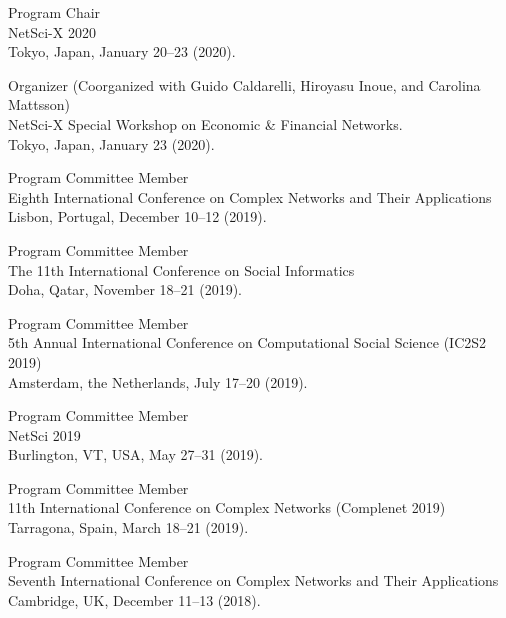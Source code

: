 \documentclass[11pt,letter]{article}
\renewenvironment{itemize}{
  \begin{list}{}{
    \setlength{\leftmargin}{1.5em}
    \setlength{\itemsep}{0.25em}
    \setlength{\parskip}{0pt}
    \setlength{\parsep}{0.25em}
  }
}{
  \end{list}
}
\begin{document}
\begin{itemize}
\item Program Chair\\
NetSci-X 2020\\
Tokyo, Japan, January 20--23 (2020).

\item Organizer (Coorganized with Guido Caldarelli, Hiroyasu Inoue, and Carolina Mattsson)\\
NetSci-X Special Workshop on Economic \& Financial Networks.\\
Tokyo, Japan, January 23 (2020).

\item Program Committee Member\\
Eighth International Conference on Complex Networks and Their Applications\\
Lisbon, Portugal, December 10--12 (2019).

\item Program Committee Member\\
The 11th International Conference on Social Informatics\\
Doha, Qatar, November 18--21 (2019).

\item Program Committee Member\\
5th Annual International Conference on Computational Social Science (IC2S2 2019)\\
Amsterdam, the Netherlands, July 17--20 (2019).

\item Program Committee Member\\
NetSci 2019\\
Burlington, VT, USA, May 27--31 (2019).

\item Program Committee Member\\
11th International Conference on Complex Networks (Complenet 2019)\\
Tarragona, Spain, March 18--21 (2019).

\item Program Committee Member\\
Seventh International Conference on Complex Networks and Their Applications\\
Cambridge, UK, December 11--13 (2018).


\end{itemize}
\end{document}
